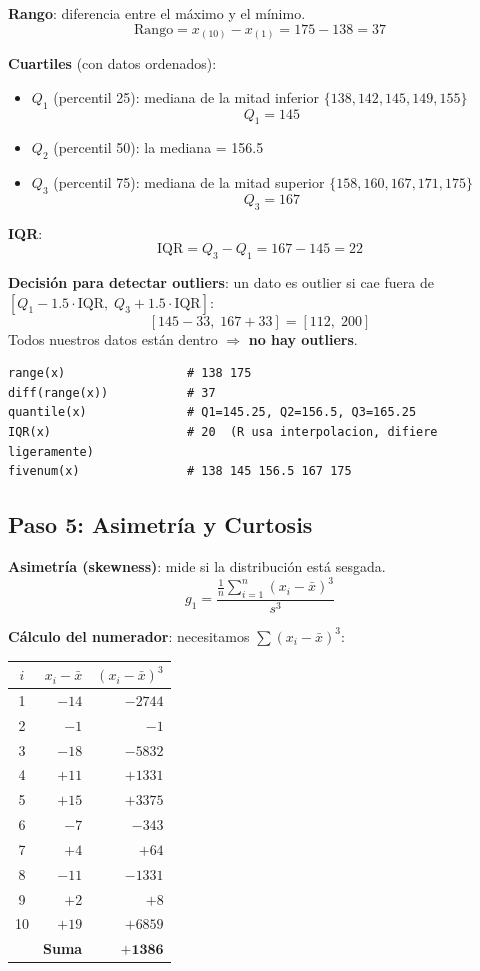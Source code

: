 \documentclass[11pt, a4paper]{article}
\begin{document}
\textbf{Rango}: diferencia entre el m\'aximo y el m\'inimo.
\[
\text{Rango} = x_{(10)} - x_{(1)} = 175 - 138 = \boxed{37}
\]

\textbf{Cuartiles} (con datos ordenados):
\begin{itemize}
  \item $Q_1$ (percentil 25): mediana de la mitad inferior $\{138, 142, 145, 149, 155\}$
  \[
  Q_1 = 145
  \]
  \item $Q_2$ (percentil 50): la mediana = 156.5
  \item $Q_3$ (percentil 75): mediana de la mitad superior $\{158, 160, 167, 171, 175\}$
  \[
  Q_3 = 167
  \]
\end{itemize}

\textbf{IQR}:
\[
\text{IQR} = Q_3 - Q_1 = 167 - 145 = \boxed{22}
\]

\textbf{Decisi\'on para detectar outliers}: un dato es outlier si cae fuera de $[Q_1 - 1.5 \cdot \text{IQR},\; Q_3 + 1.5 \cdot \text{IQR}]$:
\[
[145 - 33,\; 167 + 33] = [112,\; 200]
\]
Todos nuestros datos est\'an dentro $\Rightarrow$ \textbf{no hay outliers}.

\begin{lstlisting}
range(x)                 # 138 175
diff(range(x))           # 37
quantile(x)              # Q1=145.25, Q2=156.5, Q3=165.25
IQR(x)                   # 20  (R usa interpolacion, difiere ligeramente)
fivenum(x)               # 138 145 156.5 167 175
\end{lstlisting}

\subsection{Paso 5: Asimetr\'ia y Curtosis}

\textbf{Asimetr\'ia (skewness)}: mide si la distribuci\'on est\'a sesgada.
\[
g_1 = \frac{\frac{1}{n}\sum_{i=1}^{n}(x_i - \bar{x})^3}{s^3}
\]

\textbf{C\'alculo del numerador}: necesitamos $\sum(x_i - \bar{x})^3$:

\begin{center}
\small
\begin{tabular}{crr}
\toprule
$i$ & $x_i - \bar{x}$ & $(x_i - \bar{x})^3$ \\
\midrule
1 & $-14$ & $-2744$ \\
2 & $-1$  & $-1$ \\
3 & $-18$ & $-5832$ \\
4 & $+11$ & $+1331$ \\
5 & $+15$ & $+3375$ \\
6 & $-7$  & $-343$ \\
7 & $+4$  & $+64$ \\
8 & $-11$ & $-1331$ \\
9 & $+2$  & $+8$ \\
10 & $+19$ & $+6859$ \\
\midrule
 & \textbf{Suma} & $\mathbf{+1386}$ \\
\bottomrule
\end{tabular}
\end{center}
\end{document}
